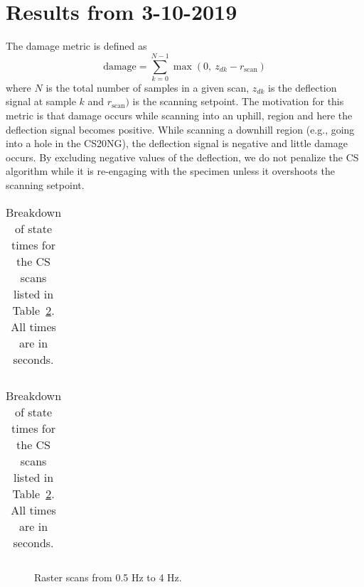 \documentclass[11pt]{article}
\begin{document}


\section*{Results from 3-10-2019}
\label{sec:orgbe19e27}
The damage metric is defined as
\begin{equation}
  \text{damage} = \sum_{k=0}^{N-1} \max(0,~z_{dk}-r_{\textrm{scan}})
\end{equation}
where $N$ is the total number of samples in a given scan, $z_{dk}$ is the deflection signal at sample $k$ and $r_{\textrm{scan}})$ is the scanning setpoint. The motivation for this metric is that damage occurs while scanning into an uphill, region and here the deflection signal becomes positive. While scanning a downhill region (e.g., going into a hole in the CS20NG), the deflection signal is negative and little damage occurs. By excluding negative values of the deflection, we do not penalize the CS algorithm while it is re-engaging with the specimen unless it overshoots the scanning setpoint. 


\begin{table}[htbp]
  \centering
  \begin{minipage}{1\textwidth}
      \begin{centering}
        \begin{tabular}{cccccc}
          
        \end{tabular}
        \label{tab:rast_vs_cs_v1}
      \end{centering}
    \end{minipage}
\begin{minipage}{1\textwidth}
  \caption{Breakdown of state times for the CS scans listed in Table~\ref{tab:rast_vs_cs_v1}. All times are in seconds.}
  \begin{tabular}{cccccccc}
    
  \end{tabular}
\end{minipage}
\end{table}



\begin{figure}[htbp]




\caption{Raster scans from 0.5 Hz to 4 Hz.}
\end{figure}
\end{document}

